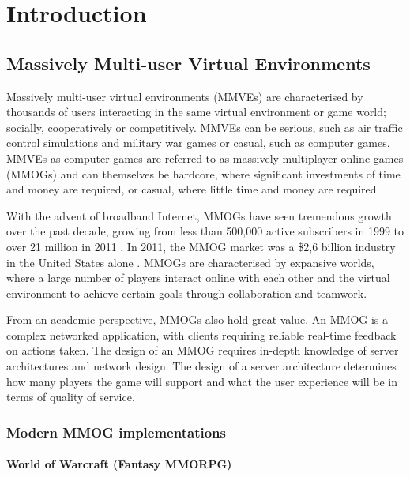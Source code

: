 \chapter{Introduction}
\label{chp:INTRO}

\section{Massively Multi-user Virtual Environments}

Massively multi-user virtual environments (MMVEs) are characterised by thousands of users interacting in the same virtual environment or game world; socially, cooperatively or competitively. MMVEs can be serious, such as air traffic control simulations and military war games or casual, such as computer games. MMVEs as computer games are referred to as massively multiplayer online games (MMOGs) and can themselves be hardcore, where significant investments of time and money are required, or casual, where little time and money are required.

With the advent of broadband Internet, MMOGs have seen tremendous growth over the past decade, growing from less than 500,000 active subscribers in 1999 to over 21 million in 2011 \cite{mmo_growth_chart}. In 2011, the MMOG market was a \$2,6 billion industry in the United States alone \cite{newzoo_mmo_report}. MMOGs are characterised by expansive worlds, where a large number of players interact online with each other and the virtual environment to achieve certain goals through collaboration and teamwork.

From an academic perspective, MMOGs also hold great value. An MMOG is a complex networked application, with clients requiring reliable real-time feedback on actions taken. The design of an MMOG requires in-depth knowledge of server architectures and network design. The design of a server architecture determines how many players the game will support and what the user experience will be in terms of quality of service.

\subsection{Modern MMOG implementations}
\label{modern_mmogs}

\subsubsection{World of Warcraft (Fantasy MMORPG)}

